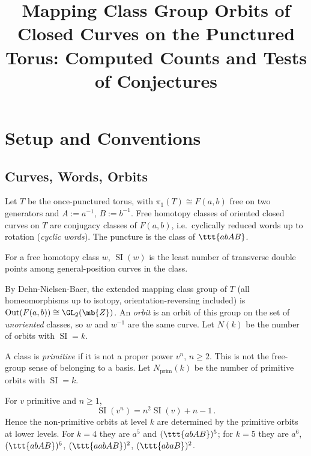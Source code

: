 \documentclass[10pt]{article}
\title{Mapping Class Group Orbits of Closed Curves on the Punctured Torus: Computed Counts and Tests of Conjectures}
\author{}
\date{}
\begin{document}
\maketitle
\tableofcontents

\section{Setup and Conventions}

\subsection{Curves, Words, Orbits}

Let $T$ be the once-punctured torus, with $\pi_1(T) \cong F(a,b)$ free on two generators and $A := a^{-1}$, $B := b^{-1}$.
Free homotopy classes of oriented closed curves on $T$ are conjugacy classes of $F(a,b)$, i.e.\ cyclically reduced words up to rotation (\emph{cyclic words}).
The puncture is the class of $\ttt{abAB}$.

\begin{defn}
	For a free homotopy class $w$, $\operatorname{SI}(w)$ is the least number of transverse double points among general-position curves in the class.
\end{defn}

\begin{defn}[Orbit]
	By Dehn-Nielsen-Baer, the extended mapping class group of $T$ (all homeomorphisms up to isotopy, orientation-reversing included) is $\operatorname{Out}(F(a,b)) \cong \GL_2(\mb{Z})$.
	An \emph{orbit} is an orbit of this group on the set of \emph{unoriented} classes, so $w$ and $w^{-1}$ are the same curve.
	Let $N(k)$ be the number of orbits with $\operatorname{SI} = k$.
\end{defn}

\begin{defn}[Primitive]
	A class is \emph{primitive} if it is not a proper power $v^n$, $n \geq 2$.
	This is not the free-group sense of belonging to a basis.
	Let $N_{\text{prim}}(k)$ be the number of primitive orbits with $\operatorname{SI} = k$.
\end{defn}

\begin{fact}[Powers]
	For $v$ primitive and $n \geq 1$,
	\[
		\operatorname{SI}(v^n) = n^2 \operatorname{SI}(v) + n - 1 \, .
	\]
	Hence the non-primitive orbits at level $k$ are determined by the primitive orbits at lower levels.
	For $k = 4$ they are $a^5$ and $(\ttt{abAB})^5$; for $k = 5$ they are $a^6$, $(\ttt{abAB})^6$, $(\ttt{aabAB})^2$, $(\ttt{abaB})^2$.
\end{fact}
\end{document}
